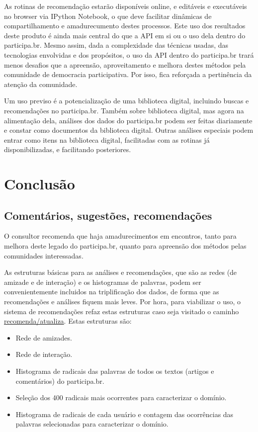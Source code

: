 \documentclass[12pt]{article}
\begin{document}
As rotinas de recomendação estarão disponíveis online, e editáveis e executáveis no browser via IPython Notebook, o que deve facilitar dinâmicas de compartilhamento e amadurecumento destes processos. Este uso dos resultados deste produto é ainda mais central do que a API em si ou o uso dela dentro do participa.br. Mesmo assim, dada a complexidade das técnicas usadas, das tecnologias envolvidas e dos propósitos, o uso da API dentro do participa.br trará menos desafios que a apreensão, aproveitamento e melhora destes métodos pela comunidade de democracia participativa. Por isso, fica reforçada a pertinência da atenção da comunidade. 

Um uso previso é a potencialização de uma biblioteca digital, incluindo buscas e recomendações no participa.br. Também sobre biblioteca digital, mas agora na alimentação dela, análises dos dados do participa.br podem ser feitas diariamente e constar como documentos da biblioteca digital. Outras análises especiais podem entrar como itens na biblioteca digital, facilitadas com as rotinas já disponibilizadas, e facilitando posteriores.

\section{Conclusão}
\subsection{Comentários, sugestões, recomendações}\label{subsec:com}
O consultor recomenda que haja amadurecimentos em encontros, tanto para melhora deste legado do participa.br, quanto para apreensão dos métodos pelas comunidades interessadas. 

As estruturas básicas para as análises e recomendações, que são as redes (de amizade e de interação) e os histogramas de palavras, podem ser convenientemente incluidos na triplificação dos dados, de forma que as recomendações e análises fiquem mais leves. Por hora, para viabilizar o uso, o sistema de recomendações refaz estas estruturas caso seja visitado o caminho \url{recomenda/atualiza}. Estas estruturas são:
\begin{itemize}
    \item Rede de amizades.
    \item Rede de interação.
    \item Histograma de radicais das palavras de todos os textos (artigos e comentários) do participa.br.
    \item Seleção dos 400 radicais mais ocorrentes para caracterizar o domínio.
    \item Histograma de radicais de cada usuário e contagem das ocorrências das palavras selecionadas para caracterizar o domínio.
\end{itemize}
\end{document}
